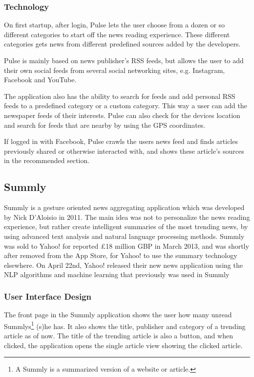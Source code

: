 \subsubsection{Technology}

On first startup, after login, Pulse lets the user choose from a dozen or so different categories to start off the news reading experience. These different categories gets news from different predefined sources added by the developers. 

Pulse is mainly based on news publisher's RSS feeds, but allows the user to add their own social feeds from several social networking sites, e.g. Instagram, Facebook and YouTube.

The application also has the ability to search for feeds and add personal RSS feeds to a predefined category or a custom category. This way a user can add the newspaper feeds of their interests. Pulse can also check for the devices location and search for feeds that are nearby by using the GPS coordinates.

If logged in with Facebook, Pulse crawls the users news feed and finds articles previously shared or otherwise interacted with, and shows these article's sources in the recommended section.


\subsection{Summly}

Summly is a gesture oriented news aggregating application which was developed by Nick D'Aloisio in 2011. The main idea was not to personalize the news reading experience, but rather create intelligent summaries of the most trending news, by using advanced text analysis and natural language processing methods\cite{summly_idea}. Summly was sold to Yahoo! for reported £18 million GBP in March 2013\cite{summly_sold_yahoo}, and was shortly after removed from the App Store, for Yahoo! to use the summary technology elsewhere\cite{summly_closed}. On April 22nd, Yahoo! released their new news application using the NLP algorithms and machine learning that previously was used in Summly\cite{yahoo_news_app_release}

\subsubsection{User Interface Design}

The front page in the Summly application shows the user how many unread Summlys\footnote{A Summly is a summarized version of a website or article.} (s)he has. It also shows the title, publisher and category of a trending article as of now. The title of the trending article is also a button, and when clicked, the application opens the single article view showing the clicked article. 

